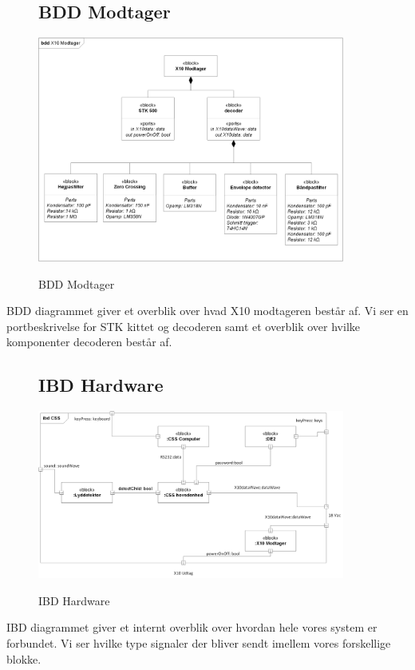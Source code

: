 \begin{figure}[htbp] \centering
\subsection{BDD Modtager}
{\includegraphics[width=0.9\textwidth]{billeder/diagrammer/BDD_Modtager}}
\caption{BDD Modtager}
\label{lab:bddmodtager}
\end{figure}
BDD diagrammet giver et overblik over hvad X10 modtageren består af. Vi ser en portbeskrivelse for STK kittet og decoderen samt et overblik over hvilke komponenter decoderen består af.

\begin{figure}[htbp] \centering
\subsection{IBD Hardware}
{\includegraphics[width=0.9\textwidth]{billeder/diagrammer/IBD_Hardware}}
\caption{IBD Hardware}
\label{lab:ibdhardware}
\end{figure}
IBD diagrammet giver et internt overblik over hvordan hele vores system er forbundet. Vi ser hvilke type signaler der bliver sendt imellem vores forskellige blokke.

